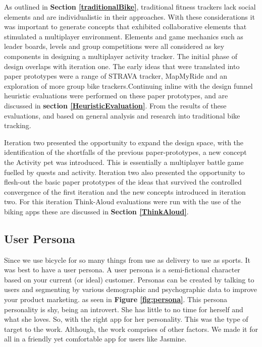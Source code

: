 \documentclass{l4proj}
\begin{document}
As outlined in \textbf{Section \ref{traditionalBike}}, traditional fitness trackers lack social elements and are individualistic in their approaches. With these considerations it was important to generate concepts that exhibited collaborative elements that stimulated a multiplayer environment. Elements and game mechanics such as leader boards, levels and group competitions were all considered as key components in designing a multiplayer activity tracker. The initial phase of design overlaps with iteration one. The early ideas that were translated into paper prototypes were a range of STRAVA tracker, MapMyRide and an exploration of more group bike  trackers.Continuing inline with the design funnel heuristic evaluations were performed on these paper prototypes, and are discussed in \textbf{section \ref{HeuristicEvaluation}}. From the results of these evaluations, and based on general analysis and research into traditional bike tracking. 

Iteration two presented the opportunity to expand the design space, with the identification of the shortfalls of the previous paper-prototypes, a new concept the Activity pet was introduced. This is essentially a multiplayer battle game fuelled by quests and activity. Iteration two also presented the opportunity to flesh-out the basic paper prototypes of the ideas that survived the controlled convergence of the first iteration and the new concepts introduced in iteration two. 
 For this iteration Think-Aloud evaluations were run with the use of the biking apps these are discussed in \textbf{Section \ref{ThinkAloud}}.


\subsection{User Persona}
Since we use bicycle for so many things from use as delivery to use as sports. It was best to have a user persona.
A user persona is a semi-fictional character based on your current (or ideal) customer. Personas can be created by talking to users and segmenting by various demographic and psychographic data to improve your product marketing. as seen in \textbf{Figure \ref{fig:persona}}. This persona personality is shy, being an introvert. She has little to no time for herself and what she loves. So, with the right app for her personality. This was the type of target to the work. Although, the work comprises of other factors. We made it for all in a friendly yet comfortable app for users like Jasmine. 
\end{document}
